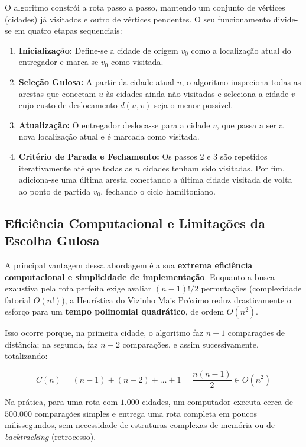 O algoritmo constrói a rota passo a passo, mantendo um conjunto de vértices (cidades) já visitados e outro de vértices pendentes. O seu funcionamento divide-se em quatro etapas sequenciais:

\begin{enumerate}
    \item \textbf{Inicialização:} Define-se a cidade de origem $v_0$ como a localização atual do entregador e marca-se $v_0$ como visitada.
    \item \textbf{Seleção Gulosa:} A partir da cidade atual $u$, o algoritmo inspeciona todas as arestas que conectam $u$ às cidades ainda não visitadas e seleciona a cidade $v$ cujo custo de deslocamento $d(u, v)$ seja o menor possível.
    \item \textbf{Atualização:} O entregador desloca-se para a cidade $v$, que passa a ser a nova localização atual e é marcada como visitada.
    \item \textbf{Critério de Parada e Fechamento:} Os passos 2 e 3 são repetidos iterativamente até que todas as $n$ cidades tenham sido visitadas. Por fim, adiciona-se uma última aresta conectando a última cidade visitada de volta ao ponto de partida $v_0$, fechando o ciclo hamiltoniano.
\end{enumerate}

\subsection{Eficiência Computacional e Limitações da Escolha Gulosa}

A principal vantagem dessa abordagem é a sua \textbf{extrema eficiência computacional e simplicidade de implementação}. Enquanto a busca exaustiva pela rota perfeita exige avaliar $(n-1)!/2$ permutações (complexidade fatorial $O(n!)$), a Heurística do Vizinho Mais Próximo reduz drasticamente o esforço para um \textbf{tempo polinomial quadrático}, de ordem $O(n^2)$.

Isso ocorre porque, na primeira cidade, o algoritmo faz $n-1$ comparações de distância; na segunda, faz $n-2$ comparações, e assim sucessivamente, totalizando:

\begin{equation}
    C(n) = (n - 1) + (n - 2) + \dots + 1 = \frac{n(n - 1)}{2} \in O(n^2)
\end{equation}

Na prática, para uma rota com $1.000$ cidades, um computador executa cerca de $500.000$ comparações simples e entrega uma rota completa em poucos milissegundos, sem necessidade de estruturas complexas de memória ou de \textit{backtracking} (retrocesso).

